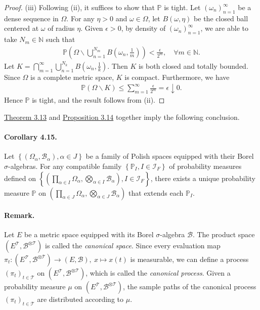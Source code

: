 \documentclass{article}
\numberwithin{equation}{section}
\renewcommand{\P}{\mathbb{P}}
\theoremstyle{plain}
\theoremstyle{definition}
\begin{document}
\begin{proof}
(iii) Following (ii), it suffices to show that $\P$ is tight. Let $(\omega_n)_{n=1}^\infty$ be a dense sequence in $\Omega$. For any $\eta>0$ and $\omega\in\Omega$, let $B(\omega,\eta)$ be the closed ball centered at $\omega$ of radius $\eta$. Given $\epsilon>0$, by density of $(\omega_n)_{n=1}^\infty$, we are able to take $N_m\in\mathbb{N}$ such that
\begin{align*}
	\P\left(\Omega\backslash\bigcup_{n=1}^{N_m}B\left(\omega_n,\frac{1}{m}\right)\right)<\frac{\epsilon}{2^m},\quad\forall m\in\mathbb{N}.
\end{align*}
Let $K=\bigcap_{m=1}^\infty\bigcup_{n=1}^{N_k}B\left(\omega_n,\frac{1}{k}\right)$. Then $K$ is both closed and totally bounded. Since $\Omega$ is a complete metric space, $K$ is compact. Furthermore, we have
\begin{align*}
	\P(\Omega\backslash K)\leq\sum_{m=1}^\infty\frac{\epsilon}{2^m}=\epsilon\downarrow 0.
\end{align*}
Hence $\P$ is tight, and the result follows from (ii).
\end{proof}

\hyperref[thm:3.13]{Theorem 3.13} and \hyperref[prop:3.13]{Proposition 3.14} together imply the following conclusion.

\paragraph{Corollary 4.15.\label{cor:4.15}} Let $\left\{(\Omega_\alpha,\mathscr{B}_\alpha),\alpha\in J\right\}$ be a family of Polish spaces equipped with their Borel $\sigma$-algebras. For any compatible family $\left\{\P_I,I\in\mathcal{I}_F\right\}$ of probability measures defined on $\left\{\left(\prod_{\alpha\in I}\Omega_\alpha,\bigotimes_{\alpha\in I}\mathscr{B}_\alpha\right),I\in\mathcal{I}_F\right\}$, there exists a unique probability measure $\P$ on $\left(\prod_{\alpha\in J}\Omega_\alpha,\bigotimes_{\alpha\in J}\mathscr{B}_\alpha\right)$ that extends each $\P_I$.

\paragraph{Remark.} Let $E$ be a metric space equipped with its Borel $\sigma$-algebra $\mathscr{B}$. The product space $(E^\mathcal{T},\mathscr{B}^{\otimes\mathcal{T}})$ is called the \textit{canonical space}. Since every evaluation map $\pi_t:(E^\mathcal{T},\mathscr{B}^{\otimes\mathcal{T}})\to(E,\mathscr{B}),\ x\mapsto x(t)$ is measurable, we can define a process $(\pi_t)_{t\in\mathscr{T}}$ on $(E^\mathcal{T},\mathscr{B}^{\otimes\mathcal{T}})$, which is called the \textit{canonical process}. Given a probability measure $\mu$ on $(E^\mathcal{T},\mathscr{B}^{\otimes\mathcal{T}})$, the sample paths of the canonical process $(\pi_t)_{t\in\mathcal{T}}$ are distributed according to $\mu$.
\end{document}

